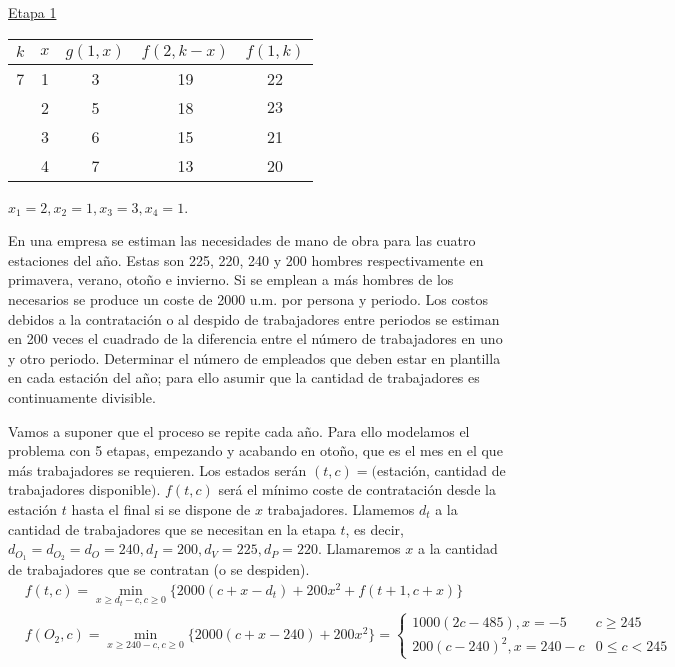 \documentclass[twoside]{article}
\begin{document}
\begin{ejercicio}{4}
\begin{solucion}
\underline{Etapa 1}
\begin{center}
\begin{tabular}{|c|c|c|c|c|}
\hline
$k$ & $x$ & $g(1,x)$ & $f(2,k-x)$ & $f(1,k)$\\
\hline
7 & 1 & 3 & 19 & 22\\
  & 2 & 5 & 18 & $\boxed{23}$\\
  & 3 & 6 & 15 & 21\\
  & 4 & 7 & 13 & 20\\
  \hline
\end{tabular}
\end{center}
$x_1=2, x_2=1, x_3=3, x_4=1$.
\end{solucion}
\end{ejercicio}

\newpage 
\begin{ejercicio}{5}
En una empresa se estiman las necesidades de mano de obra para las cuatro estaciones del año.
Estas son 225, 220, 240 y 200 hombres respectivamente en primavera, verano, otoño e invierno.
Si se emplean a más hombres de los necesarios se produce un coste de 2000 u.m. por persona
y periodo. Los costos debidos a la contratación o al despido de trabajadores entre periodos se
estiman en 200 veces el cuadrado de la diferencia entre el número de trabajadores en uno y otro
periodo.
Determinar el número de empleados que deben estar en plantilla en cada estación del año; para
ello asumir que la cantidad de trabajadores es continuamente divisible.
\begin{solucion}
Vamos a suponer que el proceso se repite cada año. Para ello modelamos el problema con 5 etapas, empezando y acabando en otoño, que es el mes en el que más trabajadores se requieren. Los estados serán $(t,c)=($estación, cantidad de trabajadores disponible$)$. $f(t,c)$ será el mínimo coste de contratación desde la estación $t$ hasta el final si se dispone de $x$ trabajadores. Llamemos $d_t$ a la cantidad de trabajadores que se necesitan en la etapa $t$, es decir, $d_{O_1}=d_{O_2}=d_O=240, d_I=200, d_V=225, d_P=220$. Llamaremos $x$ a la cantidad de trabajadores que se contratan (o se despiden).  
\begin{align*}
&f(t,c)=\min_{x\geq d_t-c,c\geq 0}\{2000(c+x-d_t)+200x^2+f(t+1,c+x)\}\\
&f(O_2,c)=\min_{x\geq 240-c,c\geq 0}\{2000(c+x-240)+200x^2\}=\begin{cases}
1000(2c-485),x=-5 & c\geq 245\\
200(c-240)^2, x=240-c & 0\leq c< 245
\end{cases}

\end{align*}
\end{solucion}
\end{ejercicio}
\end{document}
